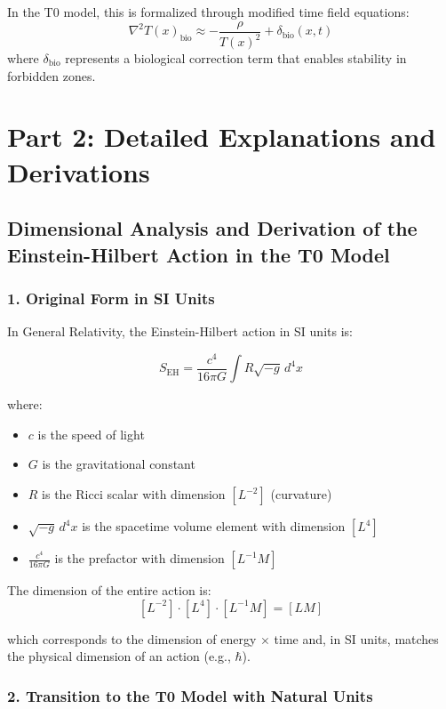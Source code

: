 \documentclass[12pt,a4paper]{article}
\newcommand{\Tfield}{T(x)}
\begin{document}
	In the T0 model, this is formalized through modified time field equations:
	\[
	\nabla^2 \Tfield_{\mathrm{bio}} \approx -\frac{\rho}{\Tfield^2} + \delta_{\mathrm{bio}}(x,t)
	\]
	where \(\delta_{\mathrm{bio}}\) represents a biological correction term that enables stability in forbidden zones.
	
	\section*{Part 2: Detailed Explanations and Derivations}
	
	\subsection*{Dimensional Analysis and Derivation of the Einstein-Hilbert Action in the T0 Model}
	
	\subsubsection*{1. Original Form in SI Units}
	
	In General Relativity, the Einstein-Hilbert action in SI units is:
	
	\[
	S_{\mathrm{EH}} = \frac{c^4}{16\pi G} \int R \sqrt{-g} \, d^4x
	\]
	
	where:
	\begin{itemize}
		\item $c$ is the speed of light
		\item $G$ is the gravitational constant
		\item $R$ is the Ricci scalar with dimension $[L^{-2}]$ (curvature)
		\item $\sqrt{-g} \, d^4x$ is the spacetime volume element with dimension $[L^4]$
		\item $\frac{c^4}{16\pi G}$ is the prefactor with dimension $[L^{-1} M]$
	\end{itemize}
	
	The dimension of the entire action is:
	\[
	[L^{-2}] \cdot [L^4] \cdot [L^{-1} M] = [L M]
	\]
	
	which corresponds to the dimension of energy $\times$ time and, in SI units, matches the physical dimension of an action (e.g., $\hbar$).
	
	\subsubsection*{2. Transition to the T0 Model with Natural Units}
	
\end{document}
